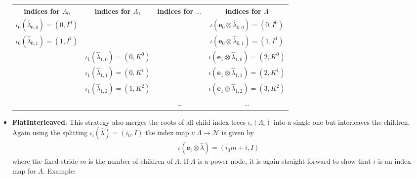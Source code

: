 \documentclass[a4paper,10pt,headings=normal,bibliography=totoc]{scrartcl}
\begin{document}
\begin{itemize}
    \begin{tabular}{c|c|c|c}
      indices for $\Lambda_0$ &
      indices for $\Lambda_1$ &
      indices for $\dots$ &
      indices for $\Lambda$ \\
      \hline
      $\iota_0(\hat{\lambda}_{0,0}) = (0,I^0)$ & & &
        $\iota(\mathbf{e}_0 \otimes \hat{\lambda}_{0,0}) = (0,I^0)$ \\
      $\iota_0(\hat{\lambda}_{0,1}) = (1,I^1)$ & & &
        $\iota(\mathbf{e}_0 \otimes \hat{\lambda}_{0,1}) = (1,I^1)$ \\
      & $\iota_1(\hat{\lambda}_{1,0}) = (0,K^0)$ & &
        $\iota(\mathbf{e}_1 \otimes \hat{\lambda}_{1,0}) = (2,K^0)$ \\
      & $\iota_1(\hat{\lambda}_{1,1}) = (0,K^1)$ & &
        $\iota(\mathbf{e}_1 \otimes \hat{\lambda}_{1,1}) = (2,K^1)$ \\
      & $\iota_1(\hat{\lambda}_{1,2}) = (1,K^2)$ & &
        $\iota(\mathbf{e}_1 \otimes \hat{\lambda}_{1,2}) = (3,K^2)$ \\
      & & \dots &
        \dots \\
    \end{tabular}

  \item \textbf{FlatInterleaved}: This strategy also merges
    the roots of all child index-trees $\iota_i(\Lambda_i)$
    into a single one but interleaves the children.
    Again using the splitting
    $\iota_i(\hat{\lambda}) = (i_0,I)$
    the index map $\iota:\Lambda \to \mathcal{N}$ is given by
    \begin{align*}
      \iota(\mathbf{e}_i \otimes\hat{\lambda}) = (i_0 m + i, I)
    \end{align*}
    where the fixed stride $m$ is the number of children of $\Lambda$.
    If $\Lambda$ is a power node, it is again straight forward to show that
    $\iota$ is an index-map for $\Lambda$.
    Example:


\end{itemize}
\end{document}
